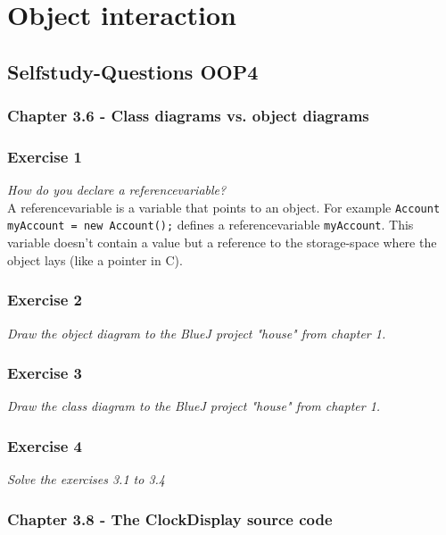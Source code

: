 \section{Object interaction}

\subsection{Selfstudy-Questions OOP4}

\subsubsection{Chapter 3.6 - Class diagrams vs. object diagrams}

\subsubsection*{Exercise 1}
\textit{How do you declare a referencevariable?}\\

A referencevariable is a variable that points to an object.
For example \lstinline{Account myAccount = new Account();} defines
a referencevariable \lstinline{myAccount}. This variable doesn't 
contain a value but a reference to the storage-space where the
object lays (like a pointer in C).

\subsubsection*{Exercise 2}
\textit{Draw the object diagram to the BlueJ project "house" from 
chapter 1.}\\


\subsubsection*{Exercise 3}
\textit{Draw the class diagram to the BlueJ project "house" from
chapter 1.}\\


\subsubsection*{Exercise 4}
\textit{Solve the exercises 3.1 to 3.4}\\

\subsubsection{Chapter 3.8 - The ClockDisplay source code}

